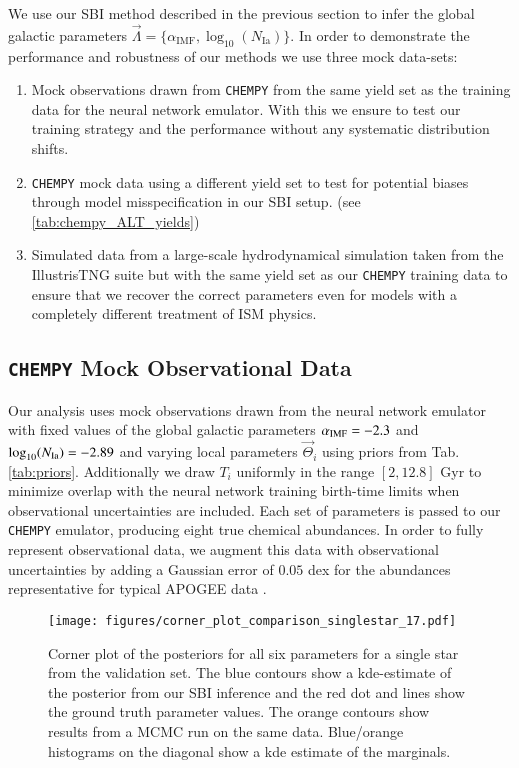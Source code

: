 \documentclass{aa}
\begin{document}
We use our SBI method described in the previous section to infer the global galactic parameters $\vec\Lambda = \{\alpha_\mathrm{IMF},\log_{10}(N_\mathrm{Ia})\}$. In order to demonstrate the performance and robustness of our methods we use three mock data-sets: 
\begin{enumerate}
    \item Mock observations drawn from \texttt{CHEMPY} from the same yield set as the training data for the neural network emulator. With this we ensure to test our training strategy and the performance without any systematic distribution shifts. 
    \item  \texttt{CHEMPY} mock data using a different yield set to test for potential biases through model misspecification in our SBI setup. (see  \ref{tab:chempy_ALT_yields})
    \item Simulated data from a large-scale hydrodynamical simulation taken from the IllustrisTNG suite \citep{Pillepich2018} but with the same yield set as our \texttt{CHEMPY} training data to ensure that we recover the correct parameters even for models with a completely different treatment of ISM physics.
\end{enumerate}

\subsection{\texttt{CHEMPY} Mock Observational Data}
\label{subsec:mock obs}
Our analysis uses mock observations drawn from the neural network emulator with fixed values of the global galactic parameters $\alpha_{\rm IMF}=-2.3$ and $\log_{10}(N_{\rm Ia})=-2.89$ and varying local parameters $\vec{\Theta}_i$ using priors from Tab. \ref{tab:priors}. Additionally we draw $T_i$ uniformly in the range $[2,12.8]$ Gyr to minimize overlap with the neural network training birth-time limits when observational uncertainties are included. 
Each set of parameters is passed to our \texttt{CHEMPY} emulator, producing eight true chemical abundances. In order to fully represent observational data, we augment this data with observational uncertainties by adding a Gaussian error of $0.05$ dex for the abundances representative for typical APOGEE data \citep{Majewski2016}.

\begin{figure*}
    \centering
    \texttt{[image: figures/corner\_plot\_comparison\_singlestar\_17.pdf]}
    \vspace{-.5cm}
    \caption{Corner plot of the posteriors for all six parameters for a single star from the validation set. The blue contours show a kde-estimate of the posterior from our SBI inference and the red dot and lines show the ground truth parameter values. The orange contours show results from a MCMC run on the same data. Blue/orange histograms on the diagonal show a kde estimate of the marginals.}
    \label{fig:corner_plot}
\end{figure*}
\end{document}
